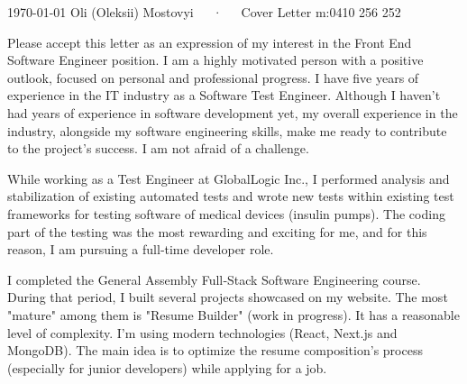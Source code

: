 \documentclass[10pt, a4paper]{awesome-cv}
\begin{document}
\makecvheader[R]

\makecvfooter
  {\today}
  {Oli (Oleksii) Mostovyi~~~·~~~Cover Letter}
  {m:0410 256 252}

\makelettertitle

\begin{cvletter}
Please accept this letter as an expression of my interest in the Front End Software Engineer position.
I am a highly motivated person with a positive outlook, focused on personal and professional progress. I have five years of experience in the IT industry as a Software Test Engineer. Although I haven't had years of experience in software development yet, my overall experience in the industry, alongside my software engineering skills, make me ready to contribute to the project's success. I am not afraid of a challenge. 

While working as a Test Engineer at GlobalLogic Inc., I performed analysis and stabilization of existing automated tests and wrote new tests within existing test frameworks for testing software of medical devices (insulin pumps). The coding part of the testing was the most rewarding and exciting for me, and for this reason, I am pursuing a full‐time developer role. 

I completed the General Assembly Full‐Stack Software Engineering course. During that period, I built several projects showcased on my website. The most "mature" among them is "Resume Builder" (work in progress). It has a reasonable level of complexity. I'm using modern technologies (React, Next.js and MongoDB). The main idea is to optimize the resume composition's process (especially for junior developers) while applying for a job. 


\end{cvletter}
\end{document}
